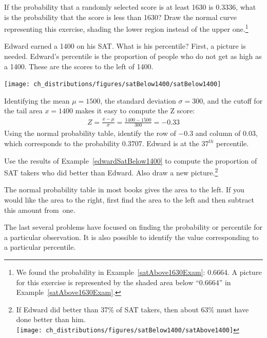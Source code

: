 \begin{exercise}
If the probability that a randomly selected score is at least 1630 is 0.3336, what is the probability that the score is less than 1630? Draw the normal curve representing this exercise, shading the lower region instead of the upper one.\footnote{We found the probability in Example~\ref{satAbove1630Exam}: 0.6664. A picture for this exercise is represented by the shaded area below ``0.6664'' in Example~\ref{satAbove1630Exam}.}
\end{exercise}

\begin{example}{Edward earned a 1400 on his SAT. What is his percentile?} \label{edwardSatBelow1400}
First, a picture is needed. Edward's percentile is the proportion of people who do not get as high as a 1400. These are the scores to the left of 1400.
\begin{center}
\texttt{[image: ch\_distributions/figures/satBelow1400/satBelow1400]}
\end{center}
Identifying the mean $\mu=1500$, the standard deviation $\sigma=300$, and the cutoff for the tail area $x=1400$ makes it easy to compute the Z score:
\begin{eqnarray*}
Z = \frac{x - \mu}{\sigma} = \frac{1400 - 1500}{300} = -0.33
\end{eqnarray*}
Using the normal probability table, identify the row of $-0.3$ and column of $0.03$, which corresponds to the probability $0.3707$. Edward is at the $37^{th}$ percentile.
\end{example}

\begin{exercise}
Use the results of Example~\ref{edwardSatBelow1400} to compute the proportion of SAT takers who did better than Edward. Also draw a new picture.\footnote{If Edward did better than 37\% of SAT takers, then about 63\% must have done better than him. \\
\texttt{[image: ch\_distributions/figures/satBelow1400/satAbove1400]}}
\end{exercise}

\begin{tipBox}{
The normal probability table in most books gives the area to the left. If you would like the area to the right, first find the area to the left and then subtract this amount from~one.}
\end{tipBox}

The last several problems have focused on finding the probability or percentile for a particular observation. It is also possible to identify the value corresponding to a particular percentile.


